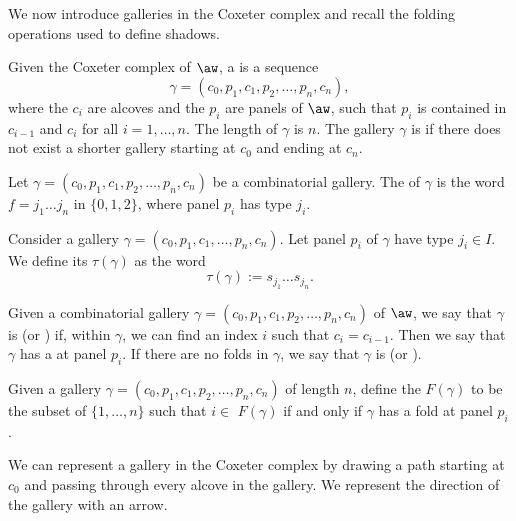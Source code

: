 \documentclass[11pt]{article}
\begin{document}
We now introduce galleries in the Coxeter complex and recall the folding operations used to define shadows.

\begin{definition}\label{comb.gallery}
    Given the Coxeter complex of $\aw$, a  is a sequence
    \[\gamma = (c_0,p_1,c_1,p_2,\hdots  ,p_n,c_n),\]
    where the $c_i$ are alcoves and the $p_i$ are panels of $\aw$, such that $p_i$ is contained in $c_{i-1}$ and $c_{i}$ for all $i=1,\hdots ,n$. The length of $\gamma$ is $n$. The gallery $\gamma$ is  if there does not exist a shorter gallery starting at $c_0$ and ending at $c_n$. 
\end{definition}


\begin{definition}\label{gallerytype}
    Let $\gamma=(c_0,p_1,c_1,p_2,\hdots  ,p_n,c_n)$ be a combinatorial gallery. The  of $\gamma$ is the word $f=j_1\hdots j_n$ in $\{0,1,2\}$, where panel $p_i$ has type $j_i$. 
\end{definition}


\begin{definition}
    Consider a gallery $\gamma = (c_0,p_1,c_1,\hdots ,p_n,c_n)$. Let panel $p_i$ of $\gamma$ have type ${j_i}\in I$. We define its  $\tau(\gamma)$ as the word 
    \[\tau(\gamma):=s_{j_1}\hdots s_{j_n}.\]
 
\end{definition}



\begin{definition}
    Given a combinatorial gallery $\gamma=(c_0,p_1,c_1,p_2,\hdots  ,p_n,c_n)$ of $\aw$, we say that $\gamma$ is  (or ) if, within $\gamma$, we can find an index $i$ such that $c_i=c_{i-1}$. Then we say that $\gamma$ has a  at panel $p_i$. If there are no folds in $\gamma$, we say that $\gamma$ is  (or ).  
\end{definition}

\begin{definition}
    Given a gallery $\gamma=(c_0,p_1,c_1,p_2,\hdots  ,p_n,c_n)$ of length $n$, define the  $F(\gamma)$ to be the subset of $\{1,\hdots ,n\}$ such that $i\in$ $F(\gamma)$ if and only if $\gamma$ has a fold at panel $p_i$. 
\end{definition}


We can represent a gallery in the Coxeter complex by drawing a path starting at $c_0$ and passing through every alcove in the gallery. We represent the direction of the gallery with an arrow. 
\end{document}
